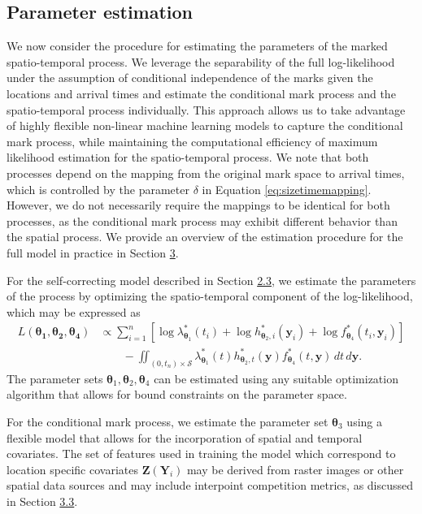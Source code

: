 \subsection{Parameter estimation}\label{parameter-estimation}

We now consider the procedure for estimating the parameters of the
marked spatio-temporal process. We leverage the separability of the full
log-likelihood under the assumption of conditional independence of the
marks given the locations and arrival times and estimate the conditional
mark process and the spatio-temporal process individually. This approach
allows us to take advantage of highly flexible non-linear machine
learning models to capture the conditional mark process, while
maintaining the computational efficiency of maximum likelihood
estimation for the spatio-temporal process. We note that both processes
depend on the mapping from the original mark space to arrival times,
which is controlled by the parameter \(\delta\) in Equation
\eqref{eq:sizetimemapping}. However, we do not necessarily require the
mappings to be identical for both processes, as the conditional mark
process may exhibit different behavior than the spatial process. We
provide an overview of the estimation procedure for the full model in
practice in Section \hyperref[sec:package]{3}.

For the self-correcting model described in Section \hyperref[selfcorrecting]{2.3}, we estimate the parameters of the process by
optimizing the spatio-temporal component of the log-likelihood, which
may be expressed as \begin{align*}
L(\boldsymbol{\theta_1}, \boldsymbol{\theta_2}, \boldsymbol{\theta_4}) &\propto \sum_{i=1}^n \left[ \log \lambda_{\boldsymbol{\theta}_1}^*(t_i) + \log h_{\boldsymbol{\theta}_2,i}^*(\boldsymbol{y}_i) + \log f_{\boldsymbol{\theta}_4}^*(t_i, \boldsymbol{y}_i) \right] \\
&\qquad - \iint_{(0, t_n) \times \mathscr{S}} \lambda_{\boldsymbol{\theta}_1}^*(t) h_{\boldsymbol{\theta}_2,t}^*(\boldsymbol{y}) f_{\boldsymbol{\theta}_4}^*(t, \boldsymbol{y}) \, dt \, d\boldsymbol{y}.
\end{align*} The parameter sets
\(\boldsymbol{\theta}_1, \boldsymbol{\theta}_2, \boldsymbol{\theta}_4\)
can be estimated using any suitable optimization algorithm that allows
for bound constraints on the parameter space.

For the conditional mark process, we estimate the parameter set
\(\boldsymbol{\theta}_3\) using a flexible model that allows for the
incorporation of spatial and temporal covariates. The set of features
used in training the model which correspond to location specific
covariates \(\boldsymbol{Z}(\boldsymbol{Y}_i)\) may be derived from raster
images or other spatial data sources and may include interpoint
competition metrics, as discussed in Section \hyperref[markmodel]{3.3}.

